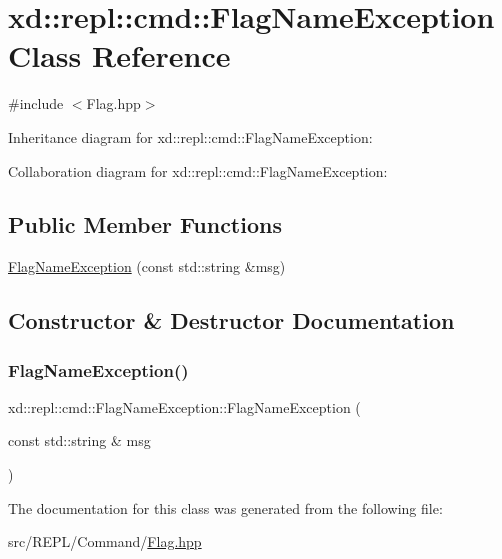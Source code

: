 \hypertarget{classxd_1_1repl_1_1cmd_1_1_flag_name_exception}{}\section{xd\+:\+:repl\+:\+:cmd\+:\+:Flag\+Name\+Exception Class Reference}
\label{classxd_1_1repl_1_1cmd_1_1_flag_name_exception}


{\ttfamily \#include $<$Flag.\+hpp$>$}



Inheritance diagram for xd\+:\+:repl\+:\+:cmd\+:\+:Flag\+Name\+Exception\+:


Collaboration diagram for xd\+:\+:repl\+:\+:cmd\+:\+:Flag\+Name\+Exception\+:
\subsection*{Public Member Functions}
\begin{DoxyCompactItemize}
\item 
\mbox{\hyperlink{classxd_1_1repl_1_1cmd_1_1_flag_name_exception_a79c4e8a3fa18ef668533a62d5588db5f}{Flag\+Name\+Exception}} (const std\+::string \&msg)
\end{DoxyCompactItemize}


\subsection{Constructor \& Destructor Documentation}
\mbox{\label{classxd_1_1repl_1_1cmd_1_1_flag_name_exception_a79c4e8a3fa18ef668533a62d5588db5f}} 
\subsubsection{\texorpdfstring{Flag\+Name\+Exception()}{FlagNameException()}}
{\footnotesize\ttfamily xd\+::repl\+::cmd\+::\+Flag\+Name\+Exception\+::\+Flag\+Name\+Exception (\begin{DoxyParamCaption}\item[{const std\+::string \&}]{msg }\end{DoxyParamCaption})\hspace{0.3cm}{\ttfamily [inline]}}



The documentation for this class was generated from the following file\+:\begin{DoxyCompactItemize}
\item 
src/\+R\+E\+P\+L/\+Command/\mbox{\hyperlink{_flag_8hpp}{Flag.\+hpp}}\end{DoxyCompactItemize}
